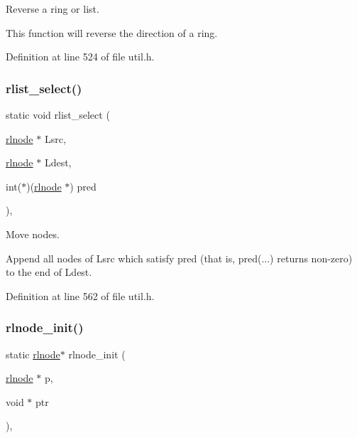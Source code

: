 Reverse a ring or list. 

This function will reverse the direction of a ring. 

Definition at line 524 of file util.\+h.

\mbox{\label{group__rlists_ga6016cbc055d242a03d823ebfec422c2b}} 
\subsubsection{\texorpdfstring{rlist\+\_\+select()}{rlist\_select()}}
{\footnotesize\ttfamily static void rlist\+\_\+select (\begin{DoxyParamCaption}\item[{\hyperlink{group__rlists_ga8f6244877f7ce2322c90525217ea6e7a}{rlnode} $\ast$}]{Lsrc,  }\item[{\hyperlink{group__rlists_ga8f6244877f7ce2322c90525217ea6e7a}{rlnode} $\ast$}]{Ldest,  }\item[{int($\ast$)(\hyperlink{group__rlists_ga8f6244877f7ce2322c90525217ea6e7a}{rlnode} $\ast$)}]{pred }\end{DoxyParamCaption})\hspace{0.3cm}{\ttfamily [inline]}, {\ttfamily [static]}}



Move nodes. 

Append all nodes of Lsrc which satisfy pred (that is, pred(...) returns non-\/zero) to the end of Ldest. 

Definition at line 562 of file util.\+h.

\mbox{\label{group__rlists_ga578e6dc256d4f1580bd8500edf374aca}} 
\subsubsection{\texorpdfstring{rlnode\+\_\+init()}{rlnode\_init()}}
{\footnotesize\ttfamily static \hyperlink{group__rlists_ga8f6244877f7ce2322c90525217ea6e7a}{rlnode}$\ast$ rlnode\+\_\+init (\begin{DoxyParamCaption}\item[{\hyperlink{group__rlists_ga8f6244877f7ce2322c90525217ea6e7a}{rlnode} $\ast$}]{p,  }\item[{void $\ast$}]{ptr }\end{DoxyParamCaption})\hspace{0.3cm}{\ttfamily [inline]}, {\ttfamily [static]}}



